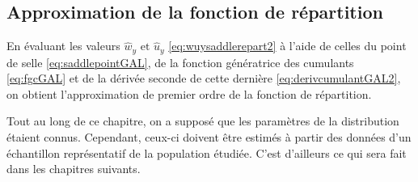 

\subsection{Approximation de la fonction de répartition}

En évaluant les valeurs $\hat{w}_y \mbox{ et } \hat{u}_y$
\eqref{eq:wuysaddlerepart2} à l'aide de celles du point de selle
\eqref{eq:saddlepointGAL}, de la fonction génératrice des cumulants
\eqref{eq:fgcGAL} et de la dérivée seconde de cette dernière
\eqref{eq:derivcumulantGAL2}, on obtient l'approximation de premier
ordre de la fonction de répartition.


Tout au long de ce chapitre, on a supposé que les paramètres de la
distribution étaient connus. Cependant, ceux-ci doivent être estimés à
partir des données d'un échantillon représentatif de la population
étudiée. C'est d'ailleurs ce qui sera fait dans les chapitres
suivants.

